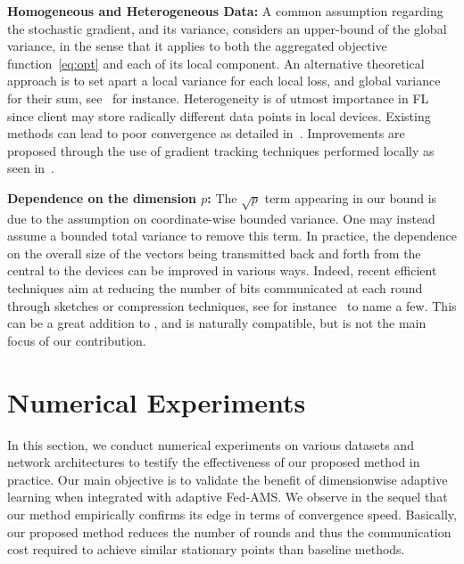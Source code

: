 \documentclass[twoside]{article}
\begin{document}
\medskip
\textbf{Homogeneous and Heterogeneous Data:} A common assumption regarding the stochastic gradient, and its variance, considers an upper-bound of the global variance, in the sense that it applies to both the aggregated objective function~\eqref{eq:opt} and each of its local component. 
An alternative theoretical approach is to set apart a local variance for each local loss, and global variance for their sum, see~\citet{chen2020toward} for instance.
Heterogeneity is of utmost importance in FL since client may store radically different data points in local devices.
Existing methods can lead to poor convergence as detailed in~\citet{li2019federated,liang2019variance}. 
Improvements are proposed through the use of gradient tracking techniques performed locally as seen in~\citet{haddadpour2020federated,horvath2019stochastic,karimireddy2019scaffold}.

\medskip
\textbf{Dependence on the dimension $p$:} The $\sqrt p$ term appearing in our bound is due to the assumption on coordinate-wise bounded variance. One may instead assume a bounded total variance to remove this term. 
In practice, the dependence on the overall size of the vectors being transmitted back and forth from the central to the devices can be improved in various ways. Indeed, recent efficient techniques aim at reducing the number of bits communicated at each round through sketches or compression techniques, see for instance~\citet{haddadpour2020fedsketch,ivkin2019communication,li2019privacy} to name a few.
This can be a great addition to \algo, and is naturally compatible, but is not the main focus of our contribution.





\section{Numerical Experiments}\label{sec:numerical}

In this section, we conduct numerical experiments on various datasets and network architectures to testify the effectiveness of our proposed method in practice. Our main objective is to validate the benefit of dimensionwise adaptive learning when integrated with adaptive Fed-AMS.
We observe in the sequel that our method empirically confirms its edge in terms of convergence speed.
Basically, our proposed method reduces the number of rounds and thus the communication cost required to achieve similar stationary points than baseline methods. 
\end{document}

